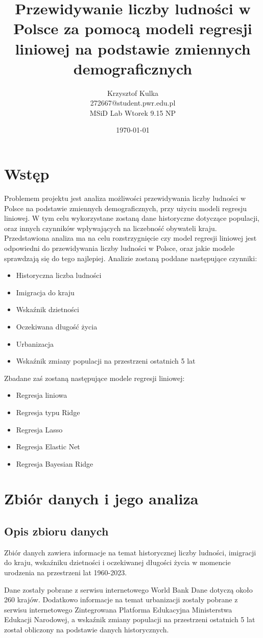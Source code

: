 \documentclass[11pt]{article}
\title{ Przewidywanie liczby ludności w Polsce za pomocą modeli regresji liniowej na podstawie zmiennych demograficznych}
\author{ Krzysztof Kulka
        \\ 272667@student.pwr.edu.pl \\ MSiD Lab Wtorek 9.15 NP }
\date{\today}
\begin{document}
\maketitle	
\pagebreak

\setcounter{tocdepth}{4}
\setcounter{secnumdepth}{4}
\tableofcontents
 \pagebreak


\section{Wstęp}
Problemem projektu jest analiza możliwości przewidywania liczby ludności w Polsce na podstawie zmiennych demograficznych, przy użyciu modeli regresju liniowej. W tym celu wykorzystane zostaną dane historyczne dotyczące populacji, oraz innych czynników wpływających na liczebność obywateli kraju.
Przedstawiona analiza ma na celu rozstrzygnięcie czy model regresji liniowej jest odpowiedni do przewidywania liczby ludności w Polsce, oraz jakie modele sprawdzają się do tego najlepiej.
Analizie zostaną poddane następujące czynniki:
\begin{itemize}
\item Historyczna liczba ludności
\item Imigracja do kraju
\item Wskaźnik dzietności
\item Oczekiwana długość życia
\item Urbanizacja
\item Wskaźnik zmiany populacji na przestrzeni ostatnich 5 lat
\end{itemize}
Zbadane zaś zostaną następujące modele regresji liniowej:
\begin{itemize}
\item Regresja liniowa
\item Regresja typu Ridge
\item Regresja Lasso
\item Regresja Elastic Net
\item Regresja Bayesian Ridge
\end{itemize}
\section{Zbiór danych i jego analiza}
\subsection{Opis zbioru danych}
Zbiór danych zawiera informacje na temat historycznej liczby ludności, imigracji do kraju, wskaźniku dzietności i oczekiwanej
długości życia w momencie urodzenia na przestrzeni lat 1960-2023.\par
Dane zostały pobrane z serwisu internetowego World Bank\cite{wbd} Dane dotyczą około 260 krajów. 
Dodatkowo informacje na temat urbanizacji
zostały pobrane z serwisu internetowego Zintegrowana Platforma Edukacyjna Ministerstwa Edukacji Narodowej\cite{zpe}, a wskaźnik zmiany populacji na przestrzeni ostatnich 5 lat został obliczony na podstawie danych historycznych.
\end{document}

